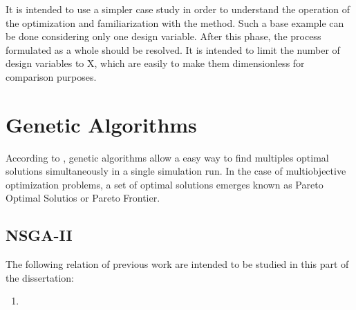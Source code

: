 It is intended to use a simpler case study in order to understand the operation of the optimization and familiarization with the method. Such a base example can be done considering only one design variable. After this phase, the process formulated as a whole should be resolved. It is intended to limit the number of design variables to X, which are easily to make them dimensionless for comparison purposes.

\section{Genetic Algorithms}
According to \cite{Deb2012}, genetic algorithms allow a easy way to find multiples optimal solutions simultaneously in a single simulation run. In the case of multiobjective optimization problems, a set of optimal solutions emerges known as Pareto Optimal Solutios or Pareto Frontier.

\subsection{NSGA-II}
The following relation of previous work are intended to be studied in this part of the dissertation:
\begin{enumerate}
    \item \cite{Deb2002}
\end{enumerate}